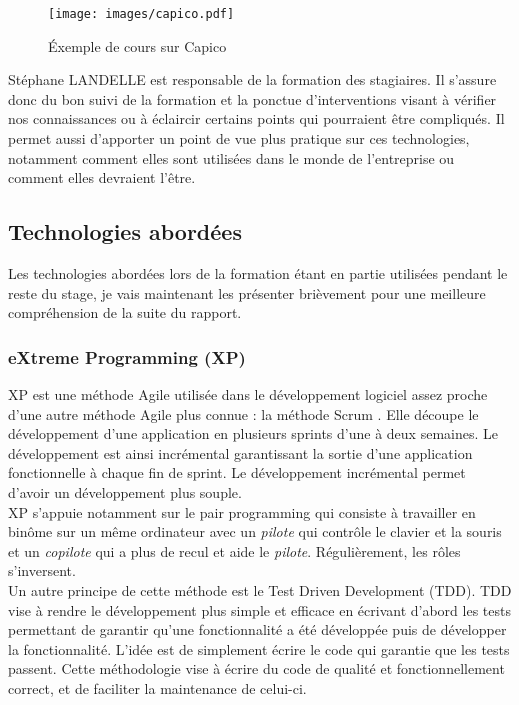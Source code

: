 \begin{figure}[H]
	\centering
	\texttt{[image: images/capico.pdf]}
	\caption{Éxemple de cours sur Capico}
\end{figure}

Stéphane LANDELLE est responsable de la formation des stagiaires. Il s'assure donc du bon suivi de la formation et la ponctue d'interventions visant à vérifier nos connaissances ou à éclaircir certains points qui pourraient être compliqués. Il permet aussi d'apporter un point de vue plus pratique sur ces technologies, notamment comment elles sont utilisées dans le monde de l'entreprise ou comment elles devraient l'être.

\subsection{Technologies abordées}

Les technologies abordées lors de la formation étant en partie utilisées pendant le reste du stage, je vais maintenant les présenter brièvement pour une meilleure compréhension de la suite du rapport.

\subsubsection{eXtreme Programming (XP)}

XP est une méthode Agile utilisée dans le développement logiciel assez proche d'une autre méthode Agile plus connue : la méthode Scrum \cite{scrum}. Elle découpe le développement d'une application en plusieurs sprints d'une à deux semaines. Le développement est ainsi incrémental garantissant la sortie d'une application fonctionnelle à chaque fin de sprint. Le développement incrémental permet d'avoir un développement plus souple.\\

XP s'appuie notamment sur le pair programming qui consiste à travailler en binôme sur un même ordinateur avec un \emph{pilote} qui contrôle le clavier et la souris et un \emph{copilote} qui a plus de recul et aide le \emph{pilote}. Régulièrement, les rôles s'inversent.\\

Un autre principe de cette méthode est le Test Driven Development (TDD). TDD vise à rendre le développement plus simple et efficace en écrivant d'abord les tests permettant de garantir qu'une fonctionnalité a été développée puis de développer la fonctionnalité. L'idée est de simplement écrire le code qui garantie que les tests passent. Cette méthodologie vise à écrire du code de qualité et fonctionnellement correct, et de faciliter la maintenance de celui-ci. 

